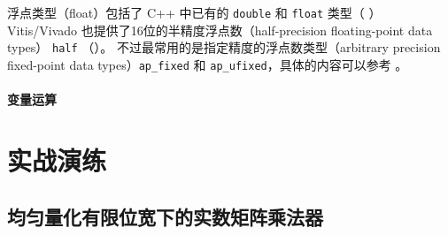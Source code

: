 \documentclass[Chinese,TC,use boldface,simple Names]{beaulivre}
\begin{document}
      \begin{definition}[浮点类型]
        浮点类型（float）包括了 C++ 中已有的 \texttt{double} 和 \texttt{float} 类型（   ）
        Vitis/Vivado 也提供了16位的半精度浮点数（half-precision floating-point data types） \texttt{half} （）。
        不过最常用的是指定精度的浮点数类型（arbitrary precision fixed-point data types）\texttt{ap\_fixed} 和 \texttt{ap\_ufixed}，具体的内容可以参考   。
      \end{definition}

    \subsection{变量运算}

\part{实战演练}

\chapter{均匀量化有限位宽下的实数矩阵乘法器}

\printindex
\end{document}
